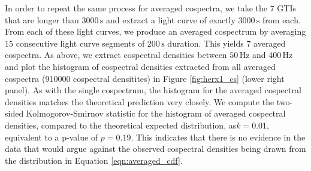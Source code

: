 \documentclass[12pt]{emulateapj}
\begin{document}
\begin{bf}
In order to repeat the same process for averaged cospectra, we take the $7$ GTIs that are longer than $3000\,\mathrm{s}$  and extract a light curve of exactly $3000\,\mathrm{s}$ from each. From each of these light curves, we produce an averaged cospectrum by averaging $15$ consecutive light curve segments of $200\,\mathrm{s}$ duration. This yields $7$ averaged cospectra. As above, we extract cospectral densities between $50\,\mathrm{Hz}$ and $400\,\mathrm{Hz}$ and plot the histogram of cospectral densities extracted from all averaged cospectra (910000 cospectral densitites) in Figure \ref{fig:herx1_cs} (lower right panel). As with the single cospectrum, the histogram for the averaged cospectral densities matches the theoretical prediction very closely. We compute the two-sided Kolmogorov-Smirnov statistic for the histogram of averaged cospectral densities, compared to the theoretical expected distribution, as$k = 0.01$, equivalent to a p-value of $p = 0.19$. This indicates that there is no evidence in the data that would argue against the observed cospectral densities being drawn from the distribution in Equation \ref{eqn:averaged_cdf}.
\end{bf}
\end{document}
